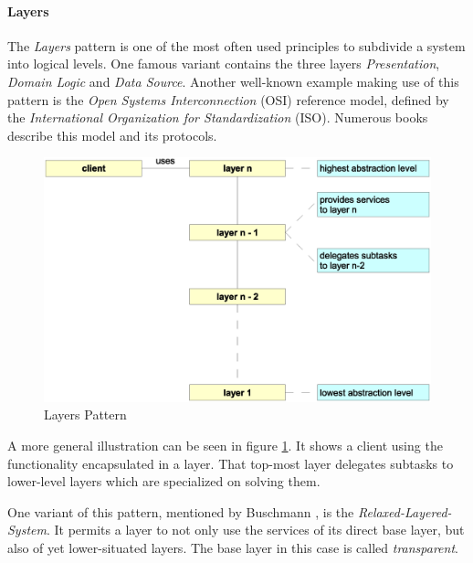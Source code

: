 %
%
%
%
%
%
%

\paragraph{Layers}
\label{layers_heading}

The \emph{Layers} pattern \cite{buschmann} is one of the most often used
principles to subdivide a system into logical levels. One famous variant contains
the three layers \emph{Presentation}, \emph{Domain Logic} and \emph{Data Source}.
Another well-known example making use of this pattern is the
\emph{Open Systems Interconnection} (OSI) reference model, defined by the
\emph{International Organization for Standardization} (ISO). Numerous books
\cite{tanenbaum2000,payer} describe this model and its protocols.

\begin{figure}[ht]
    \begin{center}
        \includegraphics[scale=0.3]{vector/layers.eps}
        \caption{Layers Pattern}
        \label{layers_figure}
    \end{center}
\end{figure}

A more general illustration can be seen in figure \ref{layers_figure}. It shows
a client using the functionality encapsulated in a layer. That top-most layer
delegates subtasks to lower-level layers which are specialized on solving them.

One variant of this pattern, mentioned by Buschmann \cite{buschmann}, is the
\emph{Relaxed-Layered-System}. It permits a layer to not only use the services
of its direct base layer, but also of yet lower-situated layers. The base layer
in this case is called \emph{transparent}.
